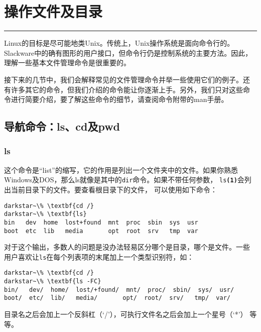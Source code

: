 
\chapter{操作文件及目录}
\label{chap:handlingFilesAndDirectories}

\rule{\textwidth}{0.1pt}

Linux的目标是尽可能地类Unix。传统上，Unix操作系统是面向命令行的。
Slackware中的确有图形的用户接口，但命令行仍是控制系统的主要方法。因此，
理解一些基本文件管理命令是很重要的。

接下来的几节中，我们会解释常见的文件管理命令并举一些使用它们的例子。还
有许多其它的命令，但我们介绍的命令能让你逐渐上手。另外，我们只对这些命
令进行简要介绍，要了解这些命令的细节，请查阅命令附带的man手册。


\section{导航命令：ls、cd及pwd}
\label{sec:handlingFilesAndDirectories:navigation}

\subsection{ls}
\label{sec:handlingFilesAndDirectories:navigation:ls}
这个命令是``list''的缩写，它的作用是列出一个文件夹中的文件。如果你熟悉
Windows及DOS，那么ls就像是其中的\texttt{dir}命令。如果不带任何参数，
\texttt{ls\textbf{(1)}}会列出当前目录下的文件。要查看根目录下的文件，
可以使用如下命令：
\begin{Verbatim}[frame=single,commandchars=\\\{\}]
darkstar~\% \textbf{cd /}
darkstar~\% \textbf{ls}
bin   dev  home  lost+found  mnt  proc  sbin  sys  usr
boot  etc  lib   media       opt  root  srv   tmp  var
\end{Verbatim}

对于这个输出，多数人的问题是没办法轻易区分哪个是目录，哪个是文件。一些
用户喜欢让\texttt{ls}在每个列表项的末尾加上一个类型识别符，如：
\begin{Verbatim}[frame=single,commandchars=\\\{\}]
darkstar~\% \textbf{cd /}
darkstar~\% \textbf{ls -FC}
bin/   dev/  home/  lost/+found/  mnt/  proc/  sbin/  sys/  usr/
boot/  etc/  lib/   media/       opt/  root/  srv/   tmp/  var/
\end{Verbatim}
目录名之后会加上一个反斜杠（`/'），可执行文件名之后会加上一个星号（`*'）
等等。


